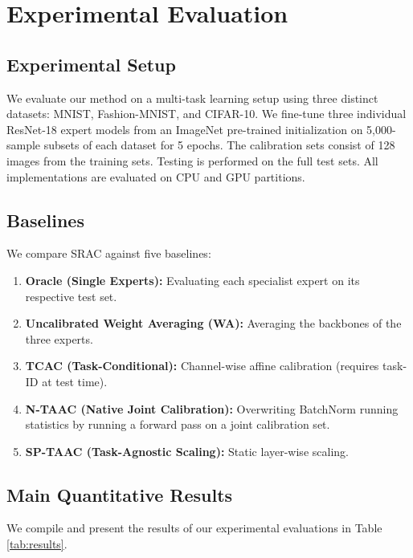 \documentclass{article}
\theoremstyle{plain}
\theoremstyle{definition}
\theoremstyle{remark}
\begin{document}
\section{Experimental Evaluation}
\label{sec:eval}

\subsection{Experimental Setup}
We evaluate our method on a multi-task learning setup using three distinct datasets: MNIST, Fashion-MNIST, and CIFAR-10. We fine-tune three individual ResNet-18 expert models from an ImageNet pre-trained initialization on 5,000-sample subsets of each dataset for 5 epochs. The calibration sets consist of 128 images from the training sets. Testing is performed on the full test sets. All implementations are evaluated on CPU and GPU partitions.

\subsection{Baselines}
We compare SRAC against five baselines:
\begin{enumerate}
  \item \textbf{Oracle (Single Experts):} Evaluating each specialist expert on its respective test set.
  \item \textbf{Uncalibrated Weight Averaging (WA):} Averaging the backbones of the three experts.
  \item \textbf{TCAC (Task-Conditional):} Channel-wise affine calibration (requires task-ID at test time).
  \item \textbf{N-TAAC (Native Joint Calibration):} Overwriting BatchNorm running statistics by running a forward pass on a joint calibration set.
  \item \textbf{SP-TAAC (Task-Agnostic Scaling):} Static layer-wise scaling.
\end{enumerate}

\subsection{Main Quantitative Results}
We compile and present the results of our experimental evaluations in Table \ref{tab:results}.
\end{document}
